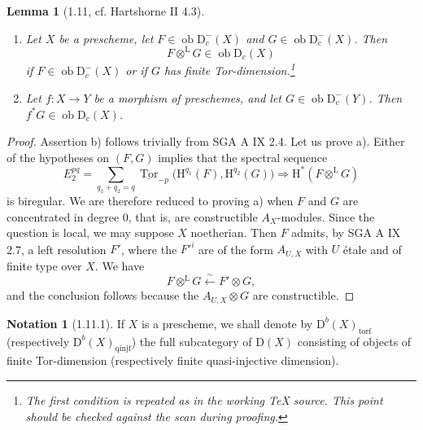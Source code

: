 \documentclass[11pt,a4paper]{article}
\newcommand{\D}{\mathrm{D}}
\newcommand{\ob}{\operatorname{ob}}
\DeclareMathOperator{\Tor}{Tor}
\newcommand{\uTor}{\underline{\Tor}}
\theoremstyle{plain}
\newtheorem*{lemmastar}{Lemma}
\theoremstyle{definition}
\newtheorem*{notationstar}{Notation}
\begin{document}
\begin{lemmastar}[1.11, cf. Hartshorne II 4.3]
\begin{enumerate}[label=\alph*)]
\item Let $X$ be a prescheme, let $F\in\ob\D_c^-(X)$ and $G\in\ob\D_c^-(X)$. Then
\[
F\otimes^{\mathrm L}G\in\ob\D_c(X)
\]
if $F\in\ob\D_c^-(X)$ or if $G$ has finite Tor-dimension.\footnote{The first condition is repeated as in the working TeX source. This point should be checked against the scan during proofing.}
\item Let $f:X\to Y$ be a morphism of preschemes, and let $G\in\ob\D_c^-(Y)$. Then $f^*G\in\ob\D_c(X)$.
\end{enumerate}
\end{lemmastar}

\begin{proof}
Assertion b) follows trivially from SGA A IX 2.4. Let us prove a). Either of the hypotheses on $(F,G)$ implies that the spectral sequence
\[
E_2^{pq}=\sum_{q_1+q_2=q}\uTor_{-p}\bigl(\mathrm H^{q_1}(F),\mathrm H^{q_2}(G)\bigr)
\Rightarrow \mathrm H^*(F\otimes^{\mathrm L}G)
\]
is biregular. We are therefore reduced to proving a) when $F$ and $G$ are concentrated in degree $0$, that is, are constructible $A_X$-modules. Since the question is local, we may suppose $X$ noetherian. Then $F$ admits, by SGA A IX 2.7, a left resolution $F'$, where the $F'^i$ are of the form $A_{U,X}$ with $U$ étale and of finite type over $X$. We have
\[
F\otimes^{\mathrm L}G\xleftarrow{\sim}F'\otimes G,
\]
and the conclusion follows because the $A_{U,X}\otimes G$ are constructible.
\end{proof}

\begin{notationstar}[1.11.1]
If $X$ is a prescheme, we shall denote by $\D^b(X)_{\mathrm{torf}}$ (respectively $\D^b(X)_{\mathrm{qinjf}}$) the full subcategory of $\D(X)$ consisting of objects of finite Tor-dimension (respectively finite quasi-injective dimension).
\end{notationstar}
\end{document}

